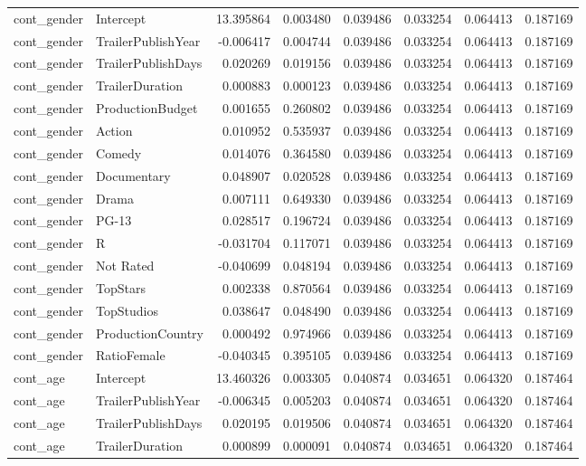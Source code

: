 \begin{tabular}{llrrrrrr}
cont_gender & Intercept & 13.395864 & 0.003480 & 0.039486 & 0.033254 & 0.064413 & 0.187169 \\
cont_gender & TrailerPublishYear & -0.006417 & 0.004744 & 0.039486 & 0.033254 & 0.064413 & 0.187169 \\
cont_gender & TrailerPublishDays & 0.020269 & 0.019156 & 0.039486 & 0.033254 & 0.064413 & 0.187169 \\
cont_gender & TrailerDuration & 0.000883 & 0.000123 & 0.039486 & 0.033254 & 0.064413 & 0.187169 \\
cont_gender & ProductionBudget & 0.001655 & 0.260802 & 0.039486 & 0.033254 & 0.064413 & 0.187169 \\
cont_gender & Action & 0.010952 & 0.535937 & 0.039486 & 0.033254 & 0.064413 & 0.187169 \\
cont_gender & Comedy & 0.014076 & 0.364580 & 0.039486 & 0.033254 & 0.064413 & 0.187169 \\
cont_gender & Documentary & 0.048907 & 0.020528 & 0.039486 & 0.033254 & 0.064413 & 0.187169 \\
cont_gender & Drama & 0.007111 & 0.649330 & 0.039486 & 0.033254 & 0.064413 & 0.187169 \\
cont_gender & PG-13 & 0.028517 & 0.196724 & 0.039486 & 0.033254 & 0.064413 & 0.187169 \\
cont_gender & R & -0.031704 & 0.117071 & 0.039486 & 0.033254 & 0.064413 & 0.187169 \\
cont_gender & Not Rated & -0.040699 & 0.048194 & 0.039486 & 0.033254 & 0.064413 & 0.187169 \\
cont_gender & TopStars & 0.002338 & 0.870564 & 0.039486 & 0.033254 & 0.064413 & 0.187169 \\
cont_gender & TopStudios & 0.038647 & 0.048490 & 0.039486 & 0.033254 & 0.064413 & 0.187169 \\
cont_gender & ProductionCountry & 0.000492 & 0.974966 & 0.039486 & 0.033254 & 0.064413 & 0.187169 \\
cont_gender & RatioFemale & -0.040345 & 0.395105 & 0.039486 & 0.033254 & 0.064413 & 0.187169 \\
cont_age & Intercept & 13.460326 & 0.003305 & 0.040874 & 0.034651 & 0.064320 & 0.187464 \\
cont_age & TrailerPublishYear & -0.006345 & 0.005203 & 0.040874 & 0.034651 & 0.064320 & 0.187464 \\
cont_age & TrailerPublishDays & 0.020195 & 0.019506 & 0.040874 & 0.034651 & 0.064320 & 0.187464 \\
cont_age & TrailerDuration & 0.000899 & 0.000091 & 0.040874 & 0.034651 & 0.064320 & 0.187464 \\

\end{tabular}
